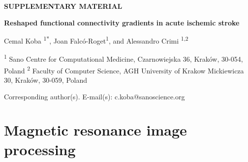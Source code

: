 \documentclass[fleqn,10pt]{wlscirep}
\begin{document}

\printbibliography

\newpage
\appendix

\begin{centering}
\begin{Large}
\textbf{SUPPLEMENTARY MATERIAL} 
\end{Large}

\begin{large}
\hfill \break
\textbf{Reshaped functional connectivity gradients in acute ischemic stroke}

\hfill \break
Cemal Koba \textsuperscript{1*}, Joan Falc\'o-Roget\textsuperscript{1}, and Alessandro Crimi \textsuperscript{1,2}
\end{large}
\end{centering}

\hfill \break
\textsuperscript{1} Sano Centre for Computational Medicine, Czarnowiejska 36, Krak\'ow, 30-054, Poland
\newline
\textsuperscript{2} Faculty of Computer Science, AGH University of Krakow Mickiewicza 30, Krak\'ow, 30-059, Poland

\hfill \break
Corresponding author(s). E-mail(s): \color{blue} c.koba@sanoscience.org \color{black}
\newline

\setcounter{figure}{0}
\renewcommand{\figurename}{Supplementary Figure}
\color{blue}
\section*{Magnetic resonance image processing}
\end{document}
